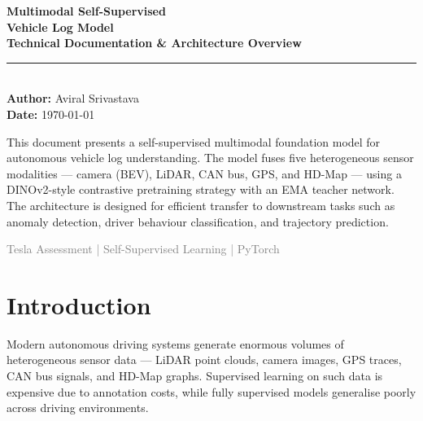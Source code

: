 \documentclass[12pt,a4paper]{article}
\begin{document}
\begin{titlepage}
    \centering
    \vspace*{1cm}

    {\Huge\bfseries\color{darkBlue} Multimodal Self-Supervised\\[0.3em]
    \textcolor{teslaRed}{Vehicle Log Model}}\\[1.5cm]

    {\large\textbf{Technical Documentation \& Architecture Overview}}\\[0.5cm]
    \rule{0.6\textwidth}{0.5pt}\\[1cm]

    {\large\textbf{Author:} Aviral Srivastava}\\[0.3cm]
    {\large\textbf{Date:} \today}\\[2cm]

    \begin{tcolorbox}[colback=darkBlue!5, colframe=darkBlue, width=0.85\textwidth,
        title={\textbf{Abstract}}, fonttitle=\bfseries\color{white},
        coltitle=white, colbacktitle=darkBlue]
        This document presents a self-supervised multimodal foundation model for
        autonomous vehicle log understanding. The model fuses five heterogeneous
        sensor modalities — camera (BEV), LiDAR, CAN bus, GPS, and HD-Map —
        using a DINOv2-style contrastive pretraining strategy with an EMA teacher
        network. The architecture is designed for efficient transfer to downstream
        tasks such as anomaly detection, driver behaviour classification, and
        trajectory prediction.
    \end{tcolorbox}

    \vfill
    \small\textcolor{gray}{Tesla Assessment | Self-Supervised Learning | PyTorch}
\end{titlepage}

\tableofcontents
\newpage

\section{Introduction}

Modern autonomous driving systems generate enormous volumes of heterogeneous
sensor data — LiDAR point clouds, camera images, GPS traces, CAN bus signals, and
HD-Map graphs. Supervised learning on such data is expensive due to annotation costs,
while fully supervised models generalise poorly across driving environments.
\end{document}
